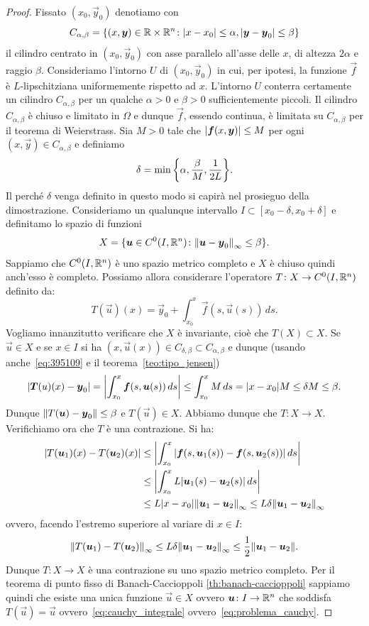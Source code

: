 \begin{proof}
Fissato $(x_0, \vec y_0)$ denotiamo con
\[
  C_{\alpha,\beta} =
  {\left\{ (x,\boldsymbol y)\in \mathbb R\times\mathbb R^n\colon {\left|x-x_0\right|}\le \alpha, {\left|\boldsymbol y -\boldsymbol y_0\right|}\le \beta \right\}}
\]
il cilindro centrato in $(x_0, \vec y_0)$ con asse parallelo all'asse delle $x$,
di altezza $2\alpha$ e raggio $\beta$.
Consideriamo l'intorno $U$ di $(x_0,\vec y_0)$ in cui, per ipotesi,
la funzione $\vec f$ è $L$-lipschitziana uniformemente rispetto ad $x$.
L'intorno $U$ conterra certamente un cilindro $C_{\alpha,\beta}$ per un qualche $\alpha>0$ e $\beta>0$
sufficientemente piccoli.
Il cilindro $C_{\alpha,\beta}$ è chiuso e limitato in $\Omega$ e dunque $\vec f$,
essendo continua, è limitata su $C_{\alpha,\beta}$ per il teorema di Weierstrass.
Sia $M>0$ tale che ${\left|\boldsymbol f(x,\boldsymbol y)\right|}\le M$ per ogni
$(x,\vec y) \in C_{\alpha,\beta}$ e definiamo
\begin{equation}\label{eq:395109}
 \delta = \min{\left\{ \alpha, \frac{\beta}{M}, \frac{1}{2L} \right\}}.
\end{equation}
Il perché $\delta$ venga definito in questo modo si capirà nel prosieguo della dimostrazione.
Consideriamo un qualunque intervallo $I\subset [x_0-\delta,x_0+\delta]$ e
definitamo lo spazio di funzioni
\[
X=\{\boldsymbol u\in C^0(I,\mathbb R^n)\colon {\left\Vert \boldsymbol u-\boldsymbol y_0\right\Vert}_\infty
\le \beta \}.
\]
Sappiamo che $C^0(I,\mathbb R^n)$ è uno spazio metrico completo e $X$ è chiuso quindi
anch'esso è completo. Possiamo allora considerare l'operatore
$T\colon X \to C^0(I, \mathbb R^n)$ definito da:
\[
  T(\vec u)(x) = \vec y_0 + \int_{x_0}^x \vec f(s, \vec u(s))\, ds.
\]
Vogliamo innanzitutto verificare che $X$ è invariante,
cioè che $T(X)\subset X$.
Se $\vec u \in X$ e se $x\in I$ si ha
$(x,\vec u(x)) \in C_{\delta,\beta} \subset C_{\alpha,\beta}$
e dunque (usando anche~\eqref{eq:395109} e il teorema~\ref{teo:tipo_jensen})
\[
  {\left|\boldsymbol T(u)(x)-\boldsymbol y_0\right|}
  = {\left|\int_{x_0}^x \boldsymbol f(s,\boldsymbol u(s))\, ds\right|}
  \le \int_{x_0}^x M\, ds = {\left|x-x_0\right|} M \le \delta M
  \le \beta.
\]
Dunque ${\left\Vert T(\boldsymbol u)-\boldsymbol y_0\right\Vert}\le \beta$ e $T(\vec u)\in X$.
Abbiamo dunque che $T\colon X \to X$. Verifichiamo ora che $T$ è una contrazione.
Si ha:
\begin{align*}
  {\left|T(\boldsymbol u_1)(x)-T(\boldsymbol u_2)(x)\right|}
   &\le {\left|\int_{x_0}^x{\left|\boldsymbol f(s,\boldsymbol u_1(s))-\boldsymbol f(s,\boldsymbol u_2(s))\right|}\, ds\right|}\\
   &\le {\left|\int_{x_0}^x L{\left|\boldsymbol u_1(s)-\boldsymbol u_2(s)\right|}\, ds\right|}\\
   &\le L {\left|x-x_0\right|}{\left\Vert \boldsymbol u_1 - \boldsymbol u_2\right\Vert}_\infty
   \le L \delta {\left\Vert \boldsymbol u_1 - \boldsymbol u_2\right\Vert}_\infty
\end{align*}
ovvero, facendo l'estremo superiore al variare di $x\in I$:
\[
 {\left\Vert T(\boldsymbol u_1)-T(\boldsymbol u_2)\right\Vert}_\infty
 \le L \delta {\left\Vert \boldsymbol u_1 - \boldsymbol u_2\right\Vert}_\infty
 \le \frac{1}{2}{\left\Vert \boldsymbol u_1- \boldsymbol u_2\right\Vert}.
\]
Dunque $T\colon X \to X$ è una contrazione su uno spazio metrico completo.
Per il teorema di punto fisso di Banach-Caccioppoli
\ref{th:banach-caccioppoli}
sappiamo quindi che esiste una unica funzione
$\vec u \in X$ ovvero $\boldsymbol u \colon I \to \mathbb R^n$ che soddisfa
$T(\vec u)=\vec u$ ovvero~\eqref{eq:cauchy_integrale}
ovvero~\eqref{eq:problema_cauchy}.
\end{proof}

